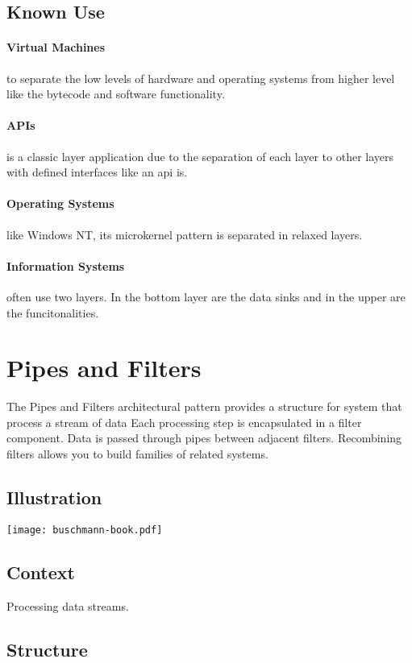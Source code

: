 \documentclass[a4paper,11pt,twocolumn]{report}
\begin{document}
    \subsection{Known Use}
    \paragraph{Virtual Machines} to separate the low levels of hardware and
    operating systems from higher level like the bytecode and software
    functionality.
    \paragraph{APIs} is a classic layer application due to the separation of
    each layer to other layers with defined interfaces like an api is.
    \paragraph{Operating Systems} like Windows NT, its microkernel pattern is
    separated in relaxed layers.
    \paragraph{Information Systems} often use two layers. In the bottom layer
    are the data sinks and in the upper are the funcitonalities.


    \section{Pipes and Filters}
    The Pipes and Filters architectural pattern provides a structure for system
    that process a stream of data Each processing step is encapsulated in a
    filter component. Data is passed through pipes between adjacent filters.
    Recombining filters allows you to build families of related systems.
    \subsection{Illustration}
    \texttt{[image: buschmann-book.pdf]}
    \subsection{Context}
    Processing data streams.
    \subsection{Structure}
\end{document}
